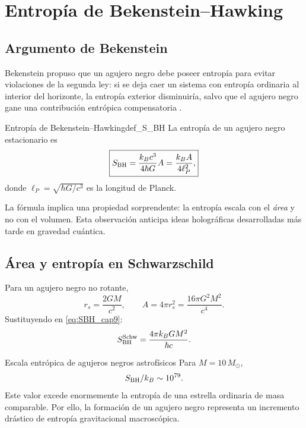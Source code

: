 \section{Entropía de Bekenstein--Hawking}
\label{sec:entropia_bekenstein_hawking}

\subsection{Argumento de Bekenstein}

Bekenstein propuso que un agujero negro debe poseer entropía para evitar violaciones de la segunda ley: si se deja caer un sistema con entropía ordinaria al interior del horizonte, la entropía exterior disminuiría, salvo que el agujero negro gane una contribución entrópica compensatoria \cite{Bekenstein1973}.

\begin{definicion}{Entropía de Bekenstein--Hawking}{def_S_BH}
La entropía de un agujero negro estacionario es
\begin{equation}
  \boxed{S_{\rm BH} = \frac{k_B c^3}{4\hbar G}A = \frac{k_B A}{4\ell_P^2},}
  \label{eq:SBH_cap9}
\end{equation}
donde $\ell_P = \sqrt{\hbar G/c^3}$ es la longitud de Planck.
\end{definicion}

La fórmula implica una propiedad sorprendente: la entropía escala con el \emph{área} y no con el volumen. Esta observación anticipa ideas holográficas desarrolladas más tarde en gravedad cuántica.

\subsection{Área y entropía en Schwarzschild}

Para un agujero negro no rotante,
\begin{equation}
  r_s = \frac{2GM}{c^2},
  \qquad
  A = 4\pi r_s^2 = \frac{16\pi G^2M^2}{c^4}.
\end{equation}
Sustituyendo en \eqref{eq:SBH_cap9}:
\begin{equation}
  S_{\rm BH}^{\text{Schw}} = \frac{4\pi k_B G M^2}{\hbar c}.
  \label{eq:SBH_schw}
\end{equation}

\begin{ejemplo}{Escala entrópica de agujeros negros astrofísicos}{}
Para $M=10\,M_\odot$,
\begin{equation}
  S_{\rm BH}/k_B \sim 10^{79}.
\end{equation}
Este valor excede enormemente la entropía de una estrella ordinaria de masa comparable. Por ello, la formación de un agujero negro representa un incremento drástico de entropía gravitacional macroscópica.
\end{ejemplo}

